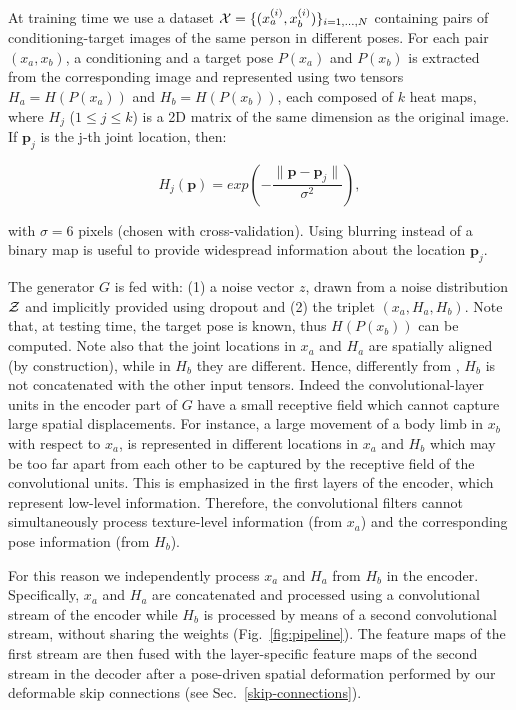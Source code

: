 \documentclass[10pt,twocolumn,letterpaper]{article}
\begin{document}
At training time we use a dataset  ${\cal X} = \{ (x_a^{(i)}, x_b^{(i)}) \}_{i=1,...,N}$ containing pairs of conditioning-target images of the same person in different poses.
For each pair $(x_a, x_b)$, a conditioning and a target pose $P(x_a)$ and $P(x_b)$ is extracted from the corresponding image and represented using two  tensors $H_a = H(P(x_a))$ and $H_b = H(P(x_b))$, each composed of $k$ heat maps, where  $H_j$ ($1 \leq j \leq k$) is a 2D matrix of the same dimension as the original image. If $\mathbf{p}_j$ is the j-th joint location, then:

\begin{equation}
H_j(\mathbf{p}) = exp\left(-\frac{\lVert \mathbf{p}- \mathbf{p}_j \rVert}{\sigma^2}\right),
\end{equation}

\noindent
with $\sigma = 6$ pixels (chosen with cross-validation).
Using
 blurring instead of a binary map is useful to provide widespread information about the location $\mathbf{p}_j$.

The generator $G$ is fed with: (1) a noise vector $z$, 
 drawn from a noise distribution ${\cal Z}$ and implicitly provided using dropout \cite{pix2pix2016} 
and (2) the triplet $(x_a, H_a, H_b)$. Note that, at testing time, the target pose is known, thus $H(P(x_b))$ can be computed.
Note also that the joint locations in $x_a$ and  $H_a$ are spatially aligned (by construction), while in $H_b$ they are different.
Hence, differently from \cite{ma2017pose,pix2pix2016}, $H_b$ is not concatenated with the other input tensors. Indeed the convolutional-layer units in the encoder part of $G$ have a small receptive field which cannot capture large spatial displacements. For instance, a large movement of a body limb in $x_b$ with respect to $x_a$, is represented in different locations in $x_a$ and $H_b$ which may be too far apart  from each other to be captured by the receptive field of the convolutional  units. This is emphasized in the first layers of the encoder, which represent low-level information. Therefore, the convolutional filters cannot simultaneously process texture-level information (from $x_a$) and the corresponding pose information (from $H_b$).

For this reason we independently process  $x_a$ and $H_a$ from $H_b$ in the encoder. 
Specifically, $x_a$ and $H_a$ are concatenated and processed
using a convolutional stream of the encoder while  $H_b$ is processed by means of  a second convolutional stream,  without sharing the weights 
(Fig.~\ref{fig:pipeline}).
The feature maps of the first stream are then fused with the layer-specific  feature maps of the second stream in the decoder  after a pose-driven spatial deformation performed by our deformable skip connections (see Sec.~\ref{skip-connections}).
\end{document}

